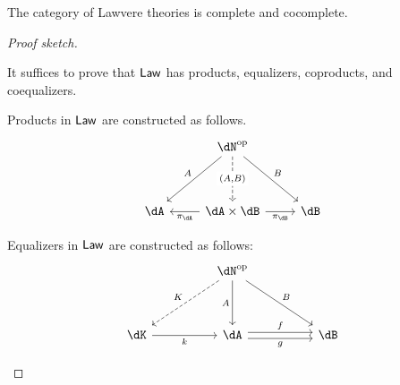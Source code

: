 \documentclass{zett}
\begin{document}
\begin{thm}
  The category of Lawvere theories is complete and cocomplete.
\end{thm}
\begin{proof}[Proof sketch]
  \begin{node}
    It suffices to prove that $\mathsf{Law}$ has products, equalizers, coproducts, and coequalizers.
  \end{node}
  \begin{node}
    Products in $\mathsf{Law}$ are constructed as follows.
    \[
      \begin{tikzcd}
	& \dN\op \\
	\\
	\dA & {\dA \times \dB} & \dB
	\arrow["A"', from=1-2, to=3-1]
	\arrow["B", from=1-2, to=3-3]
	\arrow["{\pi_{\dA}}", from=3-2, to=3-1]
	\arrow["{\pi_{\dB}}"', from=3-2, to=3-3]
	\arrow["{(A, B)}"{description}, dashed, from=1-2, to=3-2]
      \end{tikzcd}
    \]
  \end{node}
  \begin{node}
    Equalizers in $\mathsf{Law}$ are constructed as follows:
    \[
      \begin{tikzcd}
	&& \dN\op \\
	\\
	\dK && \dA && \dB
	\arrow["f", shift left, from=3-3, to=3-5]
	\arrow["g"', shift right, from=3-3, to=3-5]
	\arrow["k"', from=3-1, to=3-3]
	\arrow["A"', from=1-3, to=3-3]
	\arrow["B", from=1-3, to=3-5]
	\arrow["K"', dashed, from=1-3, to=3-1]
      \end{tikzcd}
    \]
  \end{node}


\end{proof}
\end{document}
